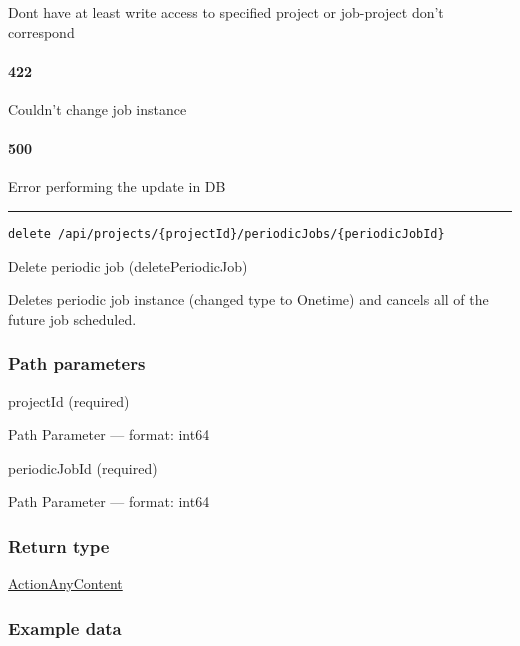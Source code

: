 Dont have at least write access to specified project or job-project
don't correspond \protect\hyperlink{}{}

\hypertarget{section-47}{%
\paragraph{422}\label{section-47}}

Couldn't change job instance \protect\hyperlink{}{}

\hypertarget{section-48}{%
\paragraph{500}\label{section-48}}

Error performing the update in DB \protect\hyperlink{}{}

\begin{center}\rule{0.5\linewidth}{0.5pt}\end{center}

\protect\hypertarget{deletePeriodicJob}{}{}



\begin{verbatim}
delete /api/projects/{projectId}/periodicJobs/{periodicJobId}
\end{verbatim}

Delete periodic job ({deletePeriodicJob})

Deletes periodic job instance (changed type to Onetime) and cancels all
of the future job scheduled.

\hypertarget{path-parameters-11}{%
\subsubsection*{Path parameters}\label{path-parameters-11}}

projectId (required)

{Path Parameter} --- format: int64

periodicJobId (required)

{Path Parameter} --- format: int64

\hypertarget{return-type-13}{%
\subsubsection*{Return type}\label{return-type-13}}

\protect\hyperlink{ActionAnyContent}{ActionAnyContent}

\hypertarget{example-data-13}{%
\subsubsection*{Example data}\label{example-data-13}}

